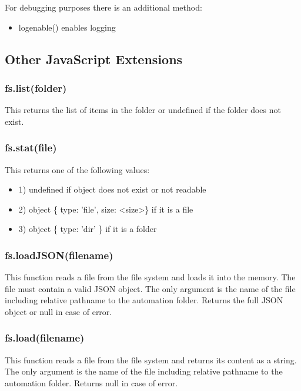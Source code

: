 For debugging purposes there is an additional method:
\begin{itemize}
\item logenable() enables logging
\end{itemize}

\subsection{Other JavaScript Extensions}

\subsubsection{fs.list(folder)}

This returns the list of items in the folder or undefined if the folder does not exist.


\subsubsection{fs.stat(file)}

This returns one of the following values:

\begin{itemize}
\item 1) undefined if object does not exist or not readable
\item 2) object \{ type: 'file', size: \textless{}size\textgreater{}\} if it is a file
\item 3) object \{ type: 'dir' \} if it is a folder
\end{itemize} 


\subsubsection{fs.loadJSON(filename)}

This function reads a file from the file system and loads it into the memory. The file 
must contain a valid JSON object. The only argument is the name of the file including 
relative pathname to the automation folder. Returns the full JSON object or null in case of error.

\subsubsection{fs.load(filename)}

This function reads a file from the file system and returns its content as a string. The 
only argument is the name of the file including relative pathname to the automation folder.
Returns null in case of error.


